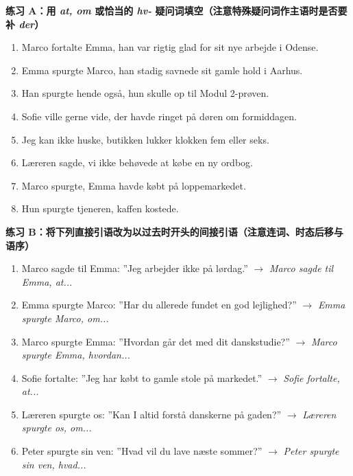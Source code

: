 \textbf{练习 A：用 \textit{at, om} 或恰当的 \textit{hv-} 疑问词填空（注意特殊疑问词作主语时是否要补 \textit{der}）}
\begin{enumerate}
  \item Marco fortalte Emma, \underline{\hspace{1.8cm}} han var rigtig glad for sit nye arbejde i Odense.
  \item Emma spurgte Marco, \underline{\hspace{1.8cm}} han stadig savnede sit gamle hold i Aarhus.
  \item Han spurgte hende også, \underline{\hspace{1.8cm}} hun skulle op til Modul 2-prøven.
  \item Sofie ville gerne vide, \underline{\hspace{1.8cm}} der havde ringet på døren om formiddagen.
  \item Jeg kan ikke huske, \underline{\hspace{1.8cm}} butikken lukker klokken fem eller seks.
  \item Læreren sagde, \underline{\hspace{1.8cm}} vi ikke behøvede at købe en ny ordbog.
  \item Marco spurgte, \underline{\hspace{1.8cm}} Emma havde købt på loppemarkedet.
  \item Hun spurgte tjeneren, \underline{\hspace{1.8cm}} kaffen kostede.
\end{enumerate}

\textbf{练习 B：将下列直接引语改为以过去时开头的间接引语（注意连词、时态后移与语序）}
\begin{enumerate}
  \item Marco sagde til Emma: ”Jeg arbejder ikke på lørdag.” $\rightarrow$ \textit{Marco sagde til Emma, at...}
  \item Emma spurgte Marco: ”Har du allerede fundet en god lejlighed?” $\rightarrow$ \textit{Emma spurgte Marco, om...}
  \item Marco spurgte Emma: ”Hvordan går det med dit danskstudie?” $\rightarrow$ \textit{Marco spurgte Emma, hvordan...}
  \item Sofie fortalte: ”Jeg har købt to gamle stole på markedet.” $\rightarrow$ \textit{Sofie fortalte, at...}
  \item Læreren spurgte os: ”Kan I altid forstå danskerne på gaden?” $\rightarrow$ \textit{Læreren spurgte os, om...}
  \item Peter spurgte sin ven: ”Hvad vil du lave næste sommer?” $\rightarrow$ \textit{Peter spurgte sin ven, hvad...}
\end{enumerate}


